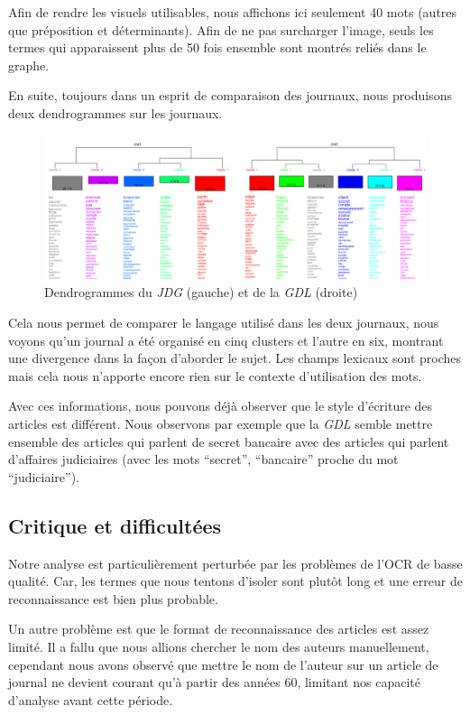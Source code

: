 \documentclass[11pt]{article}
\begin{document}
Afin de rendre les visuels utilisables, nous affichons ici seulement 40
mots (autres que préposition et déterminants). Afin de ne pas surcharger
l'image, seuls les termes qui apparaissent plus de 50 fois ensemble sont
montrés reliés dans le graphe.

En suite, toujours dans un esprit de comparaison des journaux, nous
produisons deux dendrogrammes sur les journaux.

\begin{figure}
\centering
\includegraphics[width=1\textwidth ]{methodology/dendrogram.png}
\caption{Dendrogrammes du \emph{JDG} (gauche) et de la \emph{GDL}
(droite)}
\end{figure}

Cela nous permet de comparer le langage utilisé dans les deux journaux,
nous voyons qu'un journal a été organisé en cinq clusters et l'autre en
six, montrant une divergence dans la façon d'aborder le sujet. Les
champs lexicaux sont proches mais cela nous n'apporte encore rien sur le
contexte d'utilisation des mots.

Avec ces informations, nous pouvons déjà observer que le style
d'écriture des articles est différent. Nous observons par exemple que la
\emph{GDL} semble mettre ensemble des articles qui parlent de secret
bancaire avec des articles qui parlent d'affaires judiciaires (avec les
mots ``secret'', ``bancaire'' proche du mot ``judiciaire'').

\hypertarget{critique-et-difficultuxe9es}{%
\subsection{Critique et
difficultées}\label{critique-et-difficultuxe9es}}

Notre analyse est particulièrement perturbée par les problèmes de l'OCR
de basse qualité. Car, les termes que nous tentons d'isoler sont plutôt
long et une erreur de reconnaissance est bien plus probable.

Un autre problème est que le format de reconnaissance des articles est
assez limité. Il a fallu que nous allions chercher le nom des auteurs
manuellement, cependant nous avons observé que mettre le nom de l'auteur
sur un article de journal ne devient courant qu'à partir des années 60,
limitant nos capacité d'analyse avant cette période.
\end{document}
